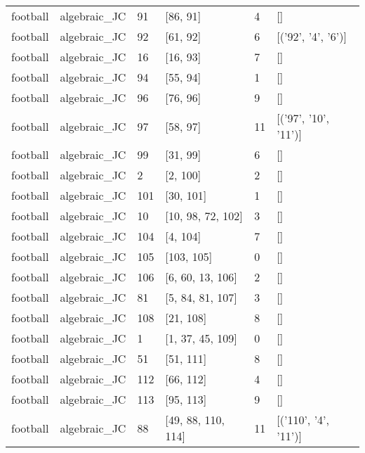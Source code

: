 \begin{tabular}{llllll}
football & algebraic_JC & 91 & [86, 91] & 4 & [] \\
football & algebraic_JC & 92 & [61, 92] & 6 & [('92', '4', '6')] \\
football & algebraic_JC & 16 & [16, 93] & 7 & [] \\
football & algebraic_JC & 94 & [55, 94] & 1 & [] \\
football & algebraic_JC & 96 & [76, 96] & 9 & [] \\
football & algebraic_JC & 97 & [58, 97] & 11 & [('97', '10', '11')] \\
football & algebraic_JC & 99 & [31, 99] & 6 & [] \\
football & algebraic_JC & 2 & [2, 100] & 2 & [] \\
football & algebraic_JC & 101 & [30, 101] & 1 & [] \\
football & algebraic_JC & 10 & [10, 98, 72, 102] & 3 & [] \\
football & algebraic_JC & 104 & [4, 104] & 7 & [] \\
football & algebraic_JC & 105 & [103, 105] & 0 & [] \\
football & algebraic_JC & 106 & [6, 60, 13, 106] & 2 & [] \\
football & algebraic_JC & 81 & [5, 84, 81, 107] & 3 & [] \\
football & algebraic_JC & 108 & [21, 108] & 8 & [] \\
football & algebraic_JC & 1 & [1, 37, 45, 109] & 0 & [] \\
football & algebraic_JC & 51 & [51, 111] & 8 & [] \\
football & algebraic_JC & 112 & [66, 112] & 4 & [] \\
football & algebraic_JC & 113 & [95, 113] & 9 & [] \\
football & algebraic_JC & 88 & [49, 88, 110, 114] & 11 & [('110', '4', '11')] \\
\bottomrule
\end{tabular}


